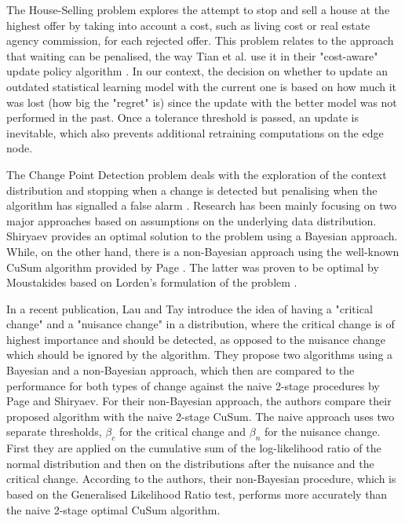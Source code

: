 \documentclass{mpaper}
\begin{document}
The House-Selling problem explores the attempt to stop and sell a house at the highest offer by taking into account a cost, such as living cost or real estate agency commission, for each rejected offer. 
This problem relates to the approach that waiting can be penalised, the way Tian et al. use it in their "cost-aware" update policy algorithm \cite{tian18}. In our context, the decision on whether to update an outdated statistical learning model with the current one is based on how much it was lost (how big the "regret" is) since the update with the better model was not performed in the past. 
Once a tolerance threshold is passed, an update is inevitable, which also prevents additional retraining computations on the edge node. 

The Change Point Detection problem deals with the exploration of the context distribution and stopping when a change is detected but penalising when the algorithm has signalled a false alarm \cite{UCLAbook}. Research has been mainly focusing on two major approaches based on assumptions on the underlying data distribution. 
Shiryaev \cite{shiryaev1963} provides an optimal solution to the problem using a Bayesian approach. While, on the other hand, there is a non-Bayesian approach using the well-known CuSum algorithm provided by Page \cite{page1954}. The latter was proven to be optimal by Moustakides \cite{moustakides1986} based on Lorden's formulation of the problem \cite{lorden1971}.

In a recent publication, Lau and Tay\cite{lautay2018} introduce the idea of having a "critical change" and a "nuisance change" in a distribution, where the critical change is of highest importance and should be detected, as opposed to the nuisance change which should be ignored by the algorithm. They propose two algorithms using a Bayesian and a non-Bayesian approach, which then are compared to the performance for both types of change against the naive 2-stage procedures by Page\cite{page1954} and Shiryaev\cite{shiryaev1963}.
For their non-Bayesian approach, the authors compare their proposed algorithm with the naive 2-stage CuSum. The naive approach uses two separate thresholds, $\beta_c$ for the critical change and $\beta_n$ for the nuisance change. First they are applied on the cumulative sum of the log-likelihood ratio of the normal distribution and then on the distributions after the nuisance and the critical change. According to the authors, their non-Bayesian procedure, which is based on the Generalised Likelihood Ratio test, performs more accurately than the naive 2-stage optimal CuSum algorithm.
\end{document}

